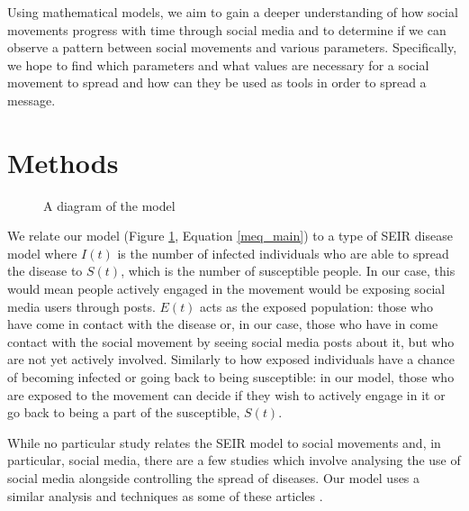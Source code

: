 \documentclass{article}
\begin{document}
    Using mathematical models, we aim to gain a deeper understanding of how social movements progress with time through social media and to determine if we can observe a pattern between social movements and various parameters. Specifically, we hope to find which parameters and what values are necessary for a social movement to spread and how can they be used as tools in order to spread a message.

    \section{Methods}

    \begin{figure}
        \centering
        
        \caption{A diagram of the model}
        \label{fig:model_diagram}
    \end{figure}
    
    We relate our model (Figure \ref{fig:model_diagram}, Equation \ref{meq_main}) to a type of SEIR disease model where $I(t)$ is the number of infected individuals who are able to spread the disease to $S(t)$, which is the number of susceptible people. In our case, this would mean people actively engaged in the movement would be exposing social media users through posts. $E(t)$ acts as the exposed population: those who have come in contact with the disease or, in our case, those who have in come contact with the social movement by seeing social media posts about it, but who are not yet actively involved. Similarly to how exposed individuals have a chance of becoming infected or going back to being susceptible: in our model, those who are exposed to the movement can decide if they wish to actively engage in it or go back to being a part of the susceptible, $S(t)$.

    While no particular study relates the SEIR model to social movements and, in particular, social media, there are a few studies which involve analysing the use of social media alongside controlling the spread of diseases. Our model uses a similar analysis and techniques as some of these articles \cite{du_how_2021}\cite{choi_effects_2017}.
    
\end{document}
